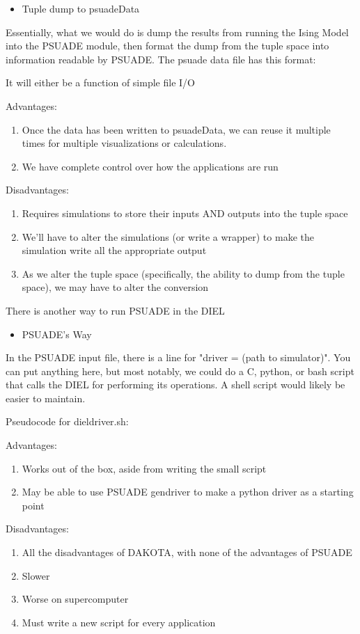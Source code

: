 \documentclass[11pt]{article} %
\begin{document}
\begin{itemize}
	\item Tuple dump to psuadeData
\end{itemize}

Essentially, what we would do is dump the results from running the Ising Model into the PSUADE module, then format the dump from the tuple space into information readable by PSUADE. The psuade data file has this format:


It will either be a function of simple file I/O 

Advantages:
\begin{enumerate}
	\item Once the data has been written to psuadeData, we can reuse it multiple times for multiple visualizations or calculations.
	\item We have complete control over how the applications are run
\end{enumerate}

Disadvantages:
\begin{enumerate}
	\item Requires simulations to store their inputs AND outputs into the tuple space
	\item We'll have to alter the simulations (or write a wrapper) to make the simulation write all the appropriate output
	\item As we alter the tuple space (specifically, the ability to dump from the tuple space), we may have to alter the conversion
\end{enumerate}

There is another way to run PSUADE in the DIEL

\begin{itemize}
	\item PSUADE's Way\\
\end{itemize}

In the PSUADE input file, there is a line for "driver = (path to simulator)". You can put anything here, but most notably, we could do a C, python, or bash script that calls the DIEL for performing its operations. A shell script would likely be easier to maintain.


Pseudocode for dieldriver.sh:


Advantages:
\begin{enumerate}
	\item Works out of the box, aside from writing the small script
	\item May be able to use PSUADE gendriver to make a python driver as a starting point
\end{enumerate}
Disadvantages:
\begin{enumerate}
	\item All the disadvantages of DAKOTA, with none of the advantages of PSUADE
	\item Slower
	\item Worse on supercomputer
	\item Must write a new script for every application
\end{enumerate}
\end{document}
